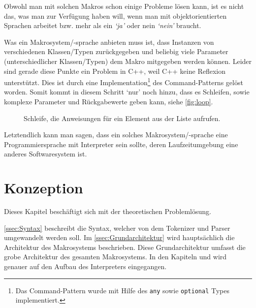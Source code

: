     Obwohl man mit solchen Makros schon einige Probleme lösen kann, ist es nicht das, was man zur Verfügung haben will, wenn man mit objektorientierten Sprachen arbeitet bzw. mehr als ein \textit{`ja'} oder nein \textit{`nein'} braucht.

    Was ein Makrosystem/-sprache anbieten muss ist, dass Instanzen von verschiedenen Klassen/Typen zurückgegeben und beliebig viele Parameter (unterschiedlicher Klassen/Typen) dem Makro mitgegeben werden können. Leider sind gerade diese Punkte ein Problem in C++, weil C++ keine Reflexion\autocites{vinoski2005time}{ferber1989computational} unterstützt. Dies ist durch eine Implementation\footnote{%
      Das Command-Pattern wurde mit Hilfe des \texttt{any}
      sowie \texttt{optional}
      Types implementiert.
    }\spewnotes{}
    des Command-Patterns gelöst worden. Somit kommt in diesem Schritt `nur' noch hinzu, dass es Schleifen, sowie komplexe Parameter und Rückgabewerte geben kann, siehe \autoref{fig:loop}.

    \begin{figure}[H]
      \centering
      \caption{Schleife, die Anweisungen für ein Element aus der Liste aufrufen.}
      \label{fig:loop}
    \end{figure}

    Letztendlich kann man sagen, dass ein solches Makrosystem/-sprache eine Programmiersprache mit Interpreter sein sollte, deren Laufzeitumgebung eine anderes Softwaresystem ist.

\section{Konzeption}
\label{sec:Konzeption}
  Dieses Kapitel beschäftigt sich mit der theoretischen Problemlösung.

  \autoref{ssec:Syntax} beschreibt die Syntax, welcher von dem Tokenizer und Parser umgewandelt werden soll. Im \autoref{ssec:Grundarchitektur} wird hauptsächlich die Architektur des Makrosystems beschrieben. Diese Grundarchitektur umfasst die grobe Architektur des gesamten Makrosystems. In den Kapiteln  und
   wird genauer auf den Aufbau des Interpreters eingegangen.

